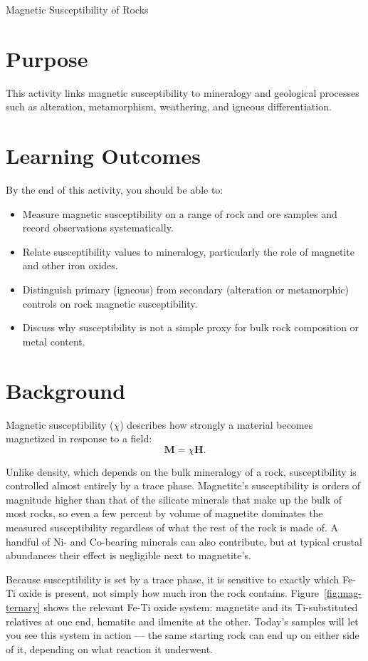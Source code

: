 \begin{activity}{Magnetic Susceptibility of Rocks}

\section*{Purpose}

This activity links magnetic susceptibility to mineralogy and geological processes such as alteration, metamorphism, weathering, and igneous differentiation.

\section*{Learning Outcomes}

By the end of this activity, you should be able to:
\begin{itemize}
  \item Measure magnetic susceptibility on a range of rock and ore samples and record observations systematically.
  \item Relate susceptibility values to mineralogy, particularly the role of magnetite and other iron oxides.
  \item Distinguish primary (igneous) from secondary (alteration or metamorphic) controls on rock magnetic susceptibility.
  \item Discuss why susceptibility is not a simple proxy for bulk rock composition or metal content.
\end{itemize}

\section*{Background}

Magnetic susceptibility ($\chi$) describes how strongly a material becomes magnetized in response to a field:
\[
    \mathbf{M} = \chi \mathbf{H} .
\]

Unlike density, which depends on the bulk mineralogy of a rock, susceptibility is controlled almost entirely by a trace phase. Magnetite's susceptibility is orders of magnitude higher than that of the silicate minerals that make up the bulk of most rocks, so even a few percent by volume of magnetite dominates the measured susceptibility regardless of what the rest of the rock is made of. A handful of Ni- and Co-bearing minerals can also contribute, but at typical crustal abundances their effect is negligible next to magnetite's.

Because susceptibility is set by a trace phase, it is sensitive to exactly which Fe-Ti oxide is present, not simply how much iron the rock contains. Figure~\ref{fig:mag-ternary} shows the relevant Fe-Ti oxide system: magnetite and its Ti-substituted relatives at one end, hematite and ilmenite at the other. Today's samples will let you see this system in action --- the same starting rock can end up on either side of it, depending on what reaction it underwent.


\end{activity}
